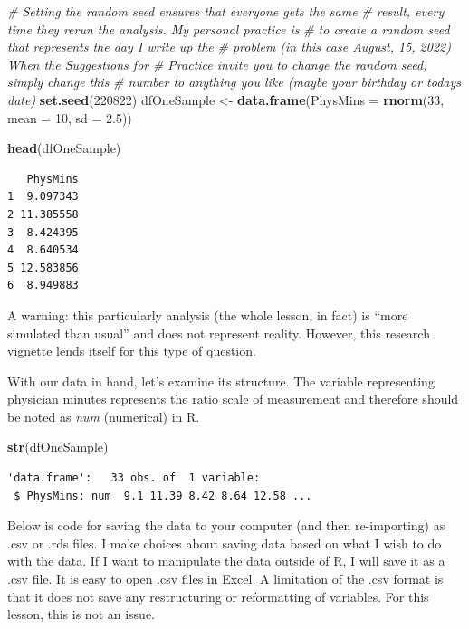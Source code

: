 \documentclass[
  11pt,
]{book}
\newenvironment{Shaded}{\begin{snugshade}}{\end{snugshade}}
\newcommand{\AttributeTok}[1]{\textcolor[rgb]{0.27,0.27,0.27}{#1}}
\newcommand{\CommentTok}[1]{\textcolor[rgb]{0.37,0.37,0.37}{\textit{#1}}}
\newcommand{\DecValTok}[1]{\textcolor[rgb]{0.06,0.06,0.06}{#1}}
\newcommand{\FloatTok}[1]{\textcolor[rgb]{0.06,0.06,0.06}{#1}}
\newcommand{\FunctionTok}[1]{\textcolor[rgb]{0.27,0.27,0.27}{\textbf{#1}}}
\newcommand{\NormalTok}[1]{#1}
\newcommand{\OtherTok}[1]{\textcolor[rgb]{0.37,0.37,0.37}{#1}}
\begin{document}
\begin{Shaded}
\begin{Highlighting}[]
\CommentTok{\# Setting the \textquotesingle{}random\textquotesingle{} seed ensures that everyone gets the same}
\CommentTok{\# result, every time they rerun the analysis. My personal practice is}
\CommentTok{\# to create a random seed that represents the day I write up the}
\CommentTok{\# problem (in this case August, 15, 2022) When the Suggestions for}
\CommentTok{\# Practice invite you to \textquotesingle{}change the random seed,\textquotesingle{} simply change this}
\CommentTok{\# number to anything you like (maybe your birthday or today\textquotesingle{}s date)}
\FunctionTok{set.seed}\NormalTok{(}\DecValTok{220822}\NormalTok{)}
\NormalTok{dfOneSample }\OtherTok{\textless{}{-}} \FunctionTok{data.frame}\NormalTok{(}\AttributeTok{PhysMins =} \FunctionTok{rnorm}\NormalTok{(}\DecValTok{33}\NormalTok{, }\AttributeTok{mean =} \DecValTok{10}\NormalTok{, }\AttributeTok{sd =} \FloatTok{2.5}\NormalTok{))}

\FunctionTok{head}\NormalTok{(dfOneSample)}
\end{Highlighting}
\end{Shaded}

\begin{verbatim}
   PhysMins
1  9.097343
2 11.385558
3  8.424395
4  8.640534
5 12.583856
6  8.949883
\end{verbatim}

A warning: this particularly analysis (the whole lesson, in fact) is ``more simulated than usual'' and does not represent reality. However, this research vignette lends itself for this type of question.

With our data in hand, let's examine its structure. The variable representing physician minutes represents the ratio scale of measurement and therefore should be noted as \emph{num} (numerical) in R.

\begin{Shaded}
\begin{Highlighting}[]
\FunctionTok{str}\NormalTok{(dfOneSample)}
\end{Highlighting}
\end{Shaded}

\begin{verbatim}
'data.frame':   33 obs. of  1 variable:
 $ PhysMins: num  9.1 11.39 8.42 8.64 12.58 ...
\end{verbatim}

Below is code for saving the data to your computer (and then re-importing) as .csv or .rds files. I make choices about saving data based on what I wish to do with the data. If I want to manipulate the data outside of R, I will save it as a .csv file. It is easy to open .csv files in Excel. A limitation of the .csv format is that it does not save any restructuring or reformatting of variables. For this lesson, this is not an issue.
\end{document}
